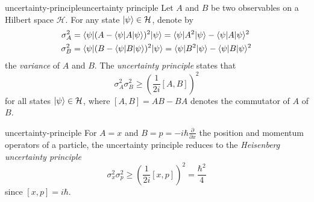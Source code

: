 \begin{topic}{uncertainty-principle}{uncertainty principle}
    Let $A$ and $B$ be two observables on a Hilbert space $\mathcal{H}$. For any state $|\psi\rangle \in \mathcal{H}$, denote by
    \[ \begin{aligned}
        \sigma_A^2 &= \langle\psi| (A - \langle\psi| A |\psi\rangle)^2 |\psi\rangle = \langle\psi| A^2 |\psi\rangle - \langle\psi| A |\psi\rangle^2 \\
        \sigma_B^2 &= \langle\psi| (B - \langle\psi| B |\psi\rangle)^2 |\psi\rangle = \langle\psi| B^2 |\psi\rangle - \langle\psi| B |\psi\rangle^2
    \end{aligned} \]
    the \textit{variance} of $A$ and $B$. The \emph{uncertainty principle} states that
    \[ \sigma_A^2 \sigma_B^2 \ge \left(\frac{1}{2 i} [A, B] \right)^2 \]
    for all states $|\psi\rangle \in \mathcal{H}$, where $[A, B] = AB - BA$ denotes the commutator of $A$ of $B$.
\end{topic}

\begin{example}{uncertainty-principle}
    For $A = x$ and $B = p = - i \hbar \tfrac{\partial}{\partial x}$ the position and momentum operators of a particle, the uncertainty principle reduces to the \textit{Heisenberg uncertainty principle}
    \[ \sigma_x^2 \sigma_p^2 \ge \left(\frac{1}{2 i} [x, p] \right)^2 = \frac{\hbar^2}{4} \]
    since $[x, p] = i \hbar$.
\end{example}
